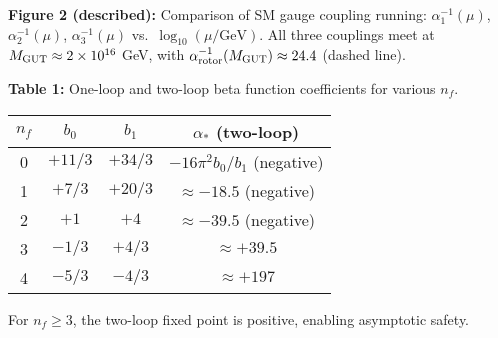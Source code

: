 \documentclass[11pt,a4paper]{article}
\numberwithin{equation}{section}
\theoremstyle{plain}
\theoremstyle{definition}
\theoremstyle{remark}
\begin{document}
\textbf{Figure 2 (described):} Comparison of SM gauge coupling running: $\alpha_1^{-1}(\mu)$, $\alpha_2^{-1}(\mu)$, $\alpha_3^{-1}(\mu)$ vs.\ $\log_{10}(\mu/\text{GeV})$. All three couplings meet at $M_{\rm GUT}\approx 2\times 10^{16}$ GeV, with $\alpha_{\rm rotor}^{-1}(M_{\rm GUT})\approx 24.4$ (dashed line).

\textbf{Table 1:} One-loop and two-loop beta function coefficients for various $n_f$.

\begin{center}
\begin{tabular}{cccc}
\toprule
$n_f$ & $b_0$ & $b_1$ & $\alpha_*$ (two-loop) \\
\midrule
0 & $+11/3$ & $+34/3$ & $-16\pi^2 b_0/b_1$ (negative) \\
1 & $+7/3$ & $+20/3$ & $\approx -18.5$ (negative) \\
2 & $+1$ & $+4$ & $\approx -39.5$ (negative) \\
3 & $-1/3$ & $+4/3$ & $\approx +39.5$ \\
4 & $-5/3$ & $-4/3$ & $\approx +197$ \\
\bottomrule
\end{tabular}
\end{center}

For $n_f\geq 3$, the two-loop fixed point is positive, enabling asymptotic safety.
\end{document}
